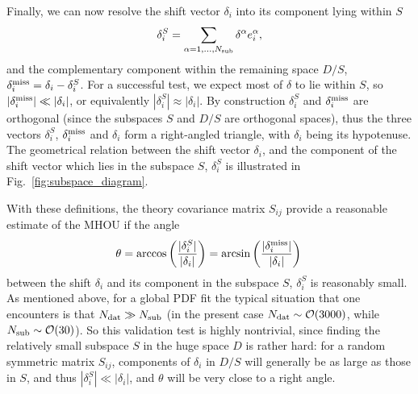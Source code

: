 Finally, we can now resolve the shift vector $\delta_i$ into its component 
lying within $S$
\begin{equation}\label{eq:deltaS}
\delta_i^{S} = \sum_{\alpha=1,\ldots, N_{\rm sub}} \delta^\alpha e_i^\alpha, 
\end{equation}
and the complementary component within the remaining space $D/S$,
$\delta_i^{\rm miss} = \delta_i-\delta^S_i$.
%
For a successful test, we expect most of $\delta$ to lie within $S$,
so $|\delta_i^{\rm miss}|\ll |\delta_i|$, or equivalently
$|\delta_i^{S}|\approx |\delta_i|$.
%
By construction $\delta_i^S$ and $\delta_i^{\rm miss}$ are orthogonal
(since the subspaces $S$ and $D/S$ are orthogonal spaces), 
thus the three vectors $\delta_i^S$, $\delta_i^{\rm miss}$ and $\delta_i$ 
form a right-angled triangle, with $\delta_i$ being its hypotenuse.  The  
geometrical relation between the shift vector $\delta_i$, and
the component of the shift vector which lies in the subspace
$S$, $\delta^S_i$ is illustrated in Fig.~\ref{fig:subspace_diagram}.

With these definitions, the theory covariance matrix $S_{ij}$
provide a reasonable estimate of the MHOU if the angle
\begin{equation}
\theta = \arccos  \left( {{|\delta^S_i|}\over {|\delta_i|}} \right) = \arcsin  \left( {{|\delta^{\rm miss}_i|}\over {|\delta_i|}}\right) \, 
\label{eq:theta}
\end{equation}
between the shift $\delta_i$ and its component in the subspace
$S$, $\delta_i^S$ is reasonably small.
As mentioned above, for a global PDF fit
the typical situation that one encounters is that
$N_{\rm dat}\gg N_{\rm sub}$ (in the present case $N_{\rm dat}\sim\mathcal{O}(3000)$, while $N_{\rm sub}\sim\mathcal{O}(30)$).
So this validation test is highly nontrivial, since finding the
relatively small subspace $S$ in the huge space $D$ is rather hard:
for a random symmetric matrix $S_{ij}$, components of $\delta_i$ in
$D/S$ will generally be as large as those in $S$, and thus
$|\delta_i^{S}|\ll |\delta_i|$, and $\theta$ will be very close to a
right angle.  
%

